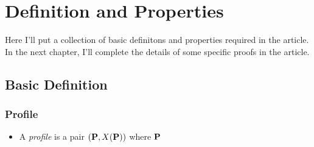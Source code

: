 \chapter{Definition and Properties}

Here I'll put a collection of basic definitons and properties required in the article. In the next chapter, I'll complete the details of some specific proofs in the article.

\section{Basic Definition}

\subsection{Profile}

\begin{definition}
    \begin{itemize}
        \item A \emph{profile} is a pair $(\mathbf{P}, X(\mathbf{P}))$ where $\mathbf{P}$
    \end{itemize}
\end{definition}